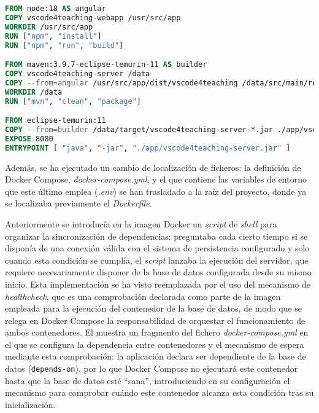 \begin{lstlisting}[language=Dockerfile,caption={Fichero \textit{Dockerfile} del proyecto, encargado de definir el proceso de generación de la imagen Docker del servidor y la aplicación web.},label=cod:dockerfile]
FROM node:18 AS angular
COPY vscode4teaching-webapp /usr/src/app
WORKDIR /usr/src/app
RUN ["npm", "install"]
RUN ["npm", "run", "build"]

FROM maven:3.9.7-eclipse-temurin-11 AS builder
COPY vscode4teaching-server /data
COPY --from=angular /usr/src/app/dist/vscode4teaching /data/src/main/resources/static/
WORKDIR /data
RUN ["mvn", "clean", "package"]

FROM eclipse-temurin:11
COPY --from=builder /data/target/vscode4teaching-server-*.jar ./app/vscode4teaching-server.jar
EXPOSE 8080
ENTRYPOINT [ "java", "-jar", "./app/vscode4teaching-server.jar" ]
\end{lstlisting}

Además, se ha ejecutado un cambio de localización de ficheros: la definición de Docker Compose, \textit{docker-compose.yml}, y el que contiene las variables de entorno que este último emplea (\textit{.env}) se han trasladado a la raíz del proyecto, donde ya se localizaba previamente el \textit{Dockerfile}.

Anteriormente se introducía en la imagen Docker un \textit{script} de \textit{shell} para organizar la sincronización de dependencias: preguntaba cada cierto tiempo si se disponía de una conexión válida con el sistema de persistencia configurado y solo cuando esta condición se cumplía, el \textit{script} lanzaba la ejecución del servidor, que requiere necesariamente disponer de la base de datos configurada desde su mismo inicio. Esta implementación se ha visto reemplazada por el uso del mecanismo de \textit{healthcheck}, que es una comprobación declarada como parte de la imagen empleada para la ejecución del contenedor de la base de datos, de modo que se relega en Docker Compose la responsabilidad de orquestar el funcionamiento de ambos contenedores. El  muestra un fragmento del fichero \textit{docker-compose.yml} en el que se configura la dependencia entre contenedores y el mecanismo de espera mediante esta comprobación: la aplicación declara ser dependiente de la base de datos (\texttt{depends-on}), por lo que Docker Compose no ejecutará este contenedor hasta que la base de datos esté ``sana'', introduciendo en su configuración el mecanismo para comprobar cuándo este contenedor alcanza esta condición tras su inicialización.

